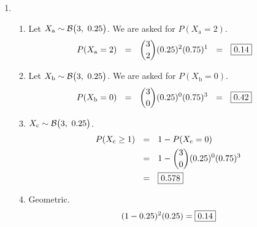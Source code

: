 \documentclass[12pt,letterpaper]{article}
\begin{document}
\begin{enumerate}
\newpage

\item \begin{enumerate}
\item Let $X_\text{a} \sim \mathcal{B}\big(3,~0.25\big)$. We are asked for $P(X_\text{a} = 2)$.
\begin{align*}
P(X_\text{a} = 2) ~~&=~~ {3\choose 2}(0.25)^2(0.75)^{1} ~~=~~ \fbox{0.14}
\end{align*}
\item Let $X_\text{b} \sim \mathcal{B}\big(3,~0.25\big)$. We are asked for $P(X_\text{b} = 0)$.
\begin{align*}
P(X_\text{b} = 0) ~~&=~~ {3\choose 0}(0.25)^0(0.75)^{3} ~~=~~ \fbox{0.42}
\end{align*}
\item $X_\text{c} \sim \mathcal{B}\big(3,~0.25\big)$. 
\begin{align*}
P(X_\text{c} \ge 1) ~~&=~~ 1-P(X_\text{c} = 0) \\
&=~~ 1-{3\choose 0}(0.25)^0(0.75)^{3} \\
&=~~ \fbox{0.578}
\end{align*}
\item Geometric.
$$(1-0.25)^2(0.25) = \fbox{0.14} $$
\end{enumerate}

\end{enumerate}
\end{document}
